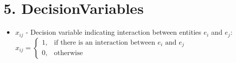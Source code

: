 \documentclass{article}
\begin{document}
\section{5. DecisionVariables}
\begin{itemize}[leftmargin=*]
    \item $x_{ij}$ - Decision variable indicating interaction between entities $e_i$ and $e_j$: \\
    $x_{ij} = \begin{cases}
        1, & \text{if there is an interaction between } e_i \text{ and } e_j \\
        0, & \text{otherwise}
    \end{cases}$
\end{itemize}
\end{document}
